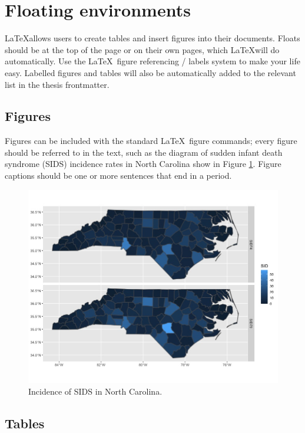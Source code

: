 \lipsum[3]

\section{Floating environments}

\LaTeX allows users to create tables and insert figures into their documents.
Floats should be at the top of the page or on their own pages, which \LaTeX will
do automatically. Use the \LaTeX \ figure referencing / labels system to make your life easy. Labelled figures and tables will also be automatically
added to the relevant list in the thesis frontmatter.

\subsection{Figures}

Figures
can be included with the standard \LaTeX \ figure commands; every figure should
be referred to in the text, such as the diagram of sudden infant death
syndrome (SIDS) incidence rates in North Carolina show in Figure \ref{fig:ncplot}.
Figure captions should be one or more
sentences that end in a period.

\begin{figure}
  \includegraphics[width=\textwidth]{./images/ncplot}
  \caption{\label{fig:ncplot} Incidence of SIDS in North Carolina.}
\end{figure}


\subsection{Tables}

